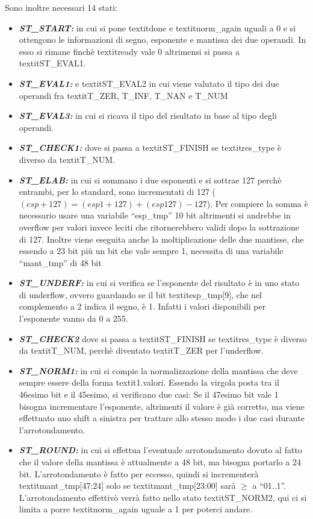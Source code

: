 \documentclass[]{IEEEtran}
\begin{document}
Sono inoltre necessari 14 stati:
\begin{itemize}
    \item {\it\bf ST\_START:} in cui si pone textit{done} e textit{norm\_again} uguali a 0 e si ottengono le informazioni di segno, esponente e mantissa dei due operandi. In esso si rimane finchè textit{ready} vale 0 altrimensi si passa a textit{ST\_EVAL1}.
    \item {\it\bf ST\_EVAL1:} e textit{ST\_EVAL2} in cui viene valutato il tipo dei due operandi fra textit{T\_ZER, T\_INF, T\_NAN e T\_NUM}
    \item {\it\bf ST\_EVAL3:} in cui si ricava il tipo del risultato in base al tipo degli operandi.
    \item {\it\bf ST\_CHECK1:} dove si passa a textit{ST\_FINISH} se textit{res\_type} è diverso da textit{T\_NUM}.
    \item {\it\bf ST\_ELAB:} in cui si sommano i due esponenti e si sottrae 127 perchè entrambi, per lo standard, sono incrementati di 127 (\((esp+127) = (esp1+127)+(esp127) - 127\)). Per compiere la somma è necessario usare una variabile ``esp\_tmp'' 10 bit altrimenti si andrebbe in overflow per valori invece leciti che ritornerebbero validi dopo la sottrazione di 127. Inoltre viene eseguita anche la moltiplicazione delle due mantisse, che essendo a 23 bit più un bit che vale sempre 1, necessita di una variabile ``mant\_tmp'' di 48 bit
    \item {\it\bf ST\_UNDERF:} in cui si verifica se l'esponente del risultato è in uno stato di underflow, ovvero guardando se il bit textit{esp\_tmp[9]}, che nel complemento a 2 indica il segno, è 1. Infatti i valori disponibili per l'esponente vanno da 0 a 255.
    \item {\it\bf ST\_CHECK2} dove si passa a textit{ST\_FINISH} se textit{res\_type} è diverso da textit{T\_NUM}, perchè diventato textit{T\_ZER} per l'underflow.
    \item {\it\bf ST\_NORM1:} in cui si compie la normalizzazione della mantissa che deve sempre essere della forma textit{1.valori}. Essendo la virgola posta tra il 46esimo bit e il 45esimo, si verificano due casi: Se il 47esimo bit vale 1 bisogna incrementare l'esponente, altrimenti il valore è già corretto, ma viene effettuato uno shift a sinistra per trattare allo stesso modo i due casi durante l'arrotondamento.
    \item {\it\bf ST\_ROUND:} in cui si effettua l'eventuale arrotondamento dovuto al fatto che il valore della mantissa è attualmente a 48 bit, ma bisogna portarlo a 24 bit. L'arrotondamento è fatto per eccesso, quindi si incrementerà textit{mant\_tmp[47:24]} solo se textit{mant\_tmp[23:00]} sarà \( \geq \) a ``01..1''. L'arrotondamento effettivò verrà fatto nello stato textit{ST\_NORM2}, qui ci si limita a porre textit{norm\_again} uguale a 1 per poterci andare.

\end{itemize}
\end{document}
